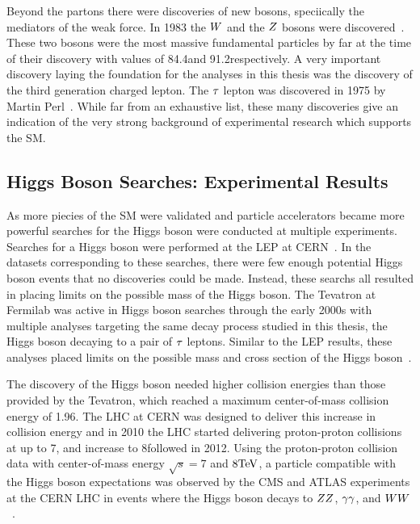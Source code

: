 Beyond the partons there were discoveries of new bosons, speciically the mediators
of the weak force.
In 1983 the $W$ and the $Z$ bosons were discovered~\cite{AUBERT1983275,1983398}. 
These two bosons were the
most massive fundamental particles by far at the time of their discovery with values of
84.4\GeV and 91.2\GeV respectively.
A very important discovery laying the foundation for the analyses in this thesis was
the discovery of the third generation charged lepton. The $\tau$ lepton was discovered
in 1975 by Martin Perl~\cite{PhysRevLett.35.1489}. While far from an exhaustive list,
these many discoveries give an indication of the very strong background of experimental
research which supports the SM.

\subsection{Higgs Boson Searches: Experimental Results}
As more piecies of the SM were validated and particle accelerators became more powerful
searches for the Higgs boson were conducted at multiple experiments.
Searches for a Higgs boson were performed at the 
LEP at CERN~\cite{Barate:2000ts,Abdallah:2003ip,Achard:2001pj,Abbiendi:2000ac}.
In the datasets corresponding to these searches, there were few enough potential Higgs
boson events that no discoveries could be made.
Instead, these searchs all resulted in placing limits on the possible mass of the Higgs boson.
The Tevatron at Fermilab was active in Higgs boson searches through the early 2000s
with multiple analyses targeting the same decay process studied in this thesis, the Higgs
boson decaying to a pair of $\tau$ leptons. Similar to the LEP results, these analyses
placed limits on the possible mass and cross section of the Higgs boson~\cite{Aaltonen:2012jh, Abazov:2012zj}.

The discovery of the Higgs boson needed higher collision energies than those provided
by the Tevatron, which reached a maximum center-of-mass collision energy of 1.96\TeV. The
LHC at CERN was designed to deliver this increase in collision energy and in 2010 the LHC started
delivering proton-proton collisions at up to 7\TeV, and increase to 8\TeV followed in 2012.
Using the proton-proton collision data with center-of-mass energy $\sqrt{s}=7$ and $8\mathrm{TeV}$,
a particle compatible with the Higgs boson expectations was observed by the CMS and ATLAS experiments at the CERN LHC
in events where the Higgs boson decays to $ZZ$, $\gamma\gamma$, and 
$WW$~\cite{Aad:2012tfa, Chatrchyan:2012xdj, Chatrchyan:2013lba}.

